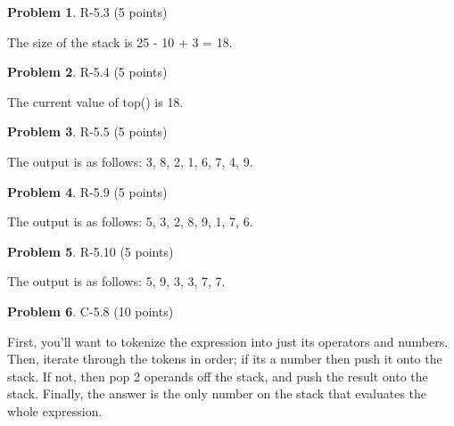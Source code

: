 \documentclass[12pt]{report}
\theoremstyle{definition}
\newtheorem{problem}{Problem}
\begin{document}
\begin{problem} 	R-5.3 (5 points) 		
\end{problem}
				The size of the stack is 25 - 10 + 3 = 18.
				
\begin{problem} 	R-5.4 (5 points)		
\end{problem}
				The current value of top() is 18.

\begin{problem} 	R-5.5 (5 points)		
\end{problem}
				The output is as follows: 3, 8, 2, 1, 6, 7, 4, 9.
				
\begin{problem} 	R-5.9 (5 points)		
\end{problem}
				The output is as follows: 5, 3, 2, 8, 9, 1, 7, 6.

\begin{problem} 	R-5.10 (5 points)		
\end{problem}
				The output is as follows: 5, 9, 3, 3, 7, 7.

\begin{problem} 	C-5.8 (10 points)		
\end{problem}
				First, you'll want to tokenize the expression into just its operators and numbers. Then, iterate 				through the tokens in order; if its a number then push it onto the stack. If not, then pop 2 					operands off the stack, and push the result onto the stack. Finally, the answer is the only 					number on the stack that evaluates the whole expression.

\goodbreak
\end{document}
